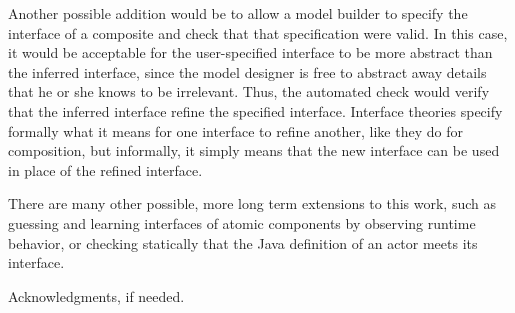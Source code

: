 \documentclass[preprint,11pt,authoryear]{sigplanconf}
\begin{document}
Another possible addition would be to allow a model builder to specify the interface of a composite and check that that specification
were valid.
In this case, it would be acceptable for the user-specified interface to be more abstract than the inferred interface, since the model designer is free to abstract away details that he or she knows to be irrelevant.
Thus, the automated check would verify that the inferred interface refine the specified interface.
Interface theories specify formally what it means for one interface to refine another, like they do for composition, but informally, it simply means that the new interface can be used in place of the refined interface.

There are many other possible, more long term extensions to this work, such as guessing and learning interfaces of atomic components by observing runtime behavior, or checking statically that the Java definition of an actor meets its interface.


\acks

Acknowledgments, if needed.




\end{document}
